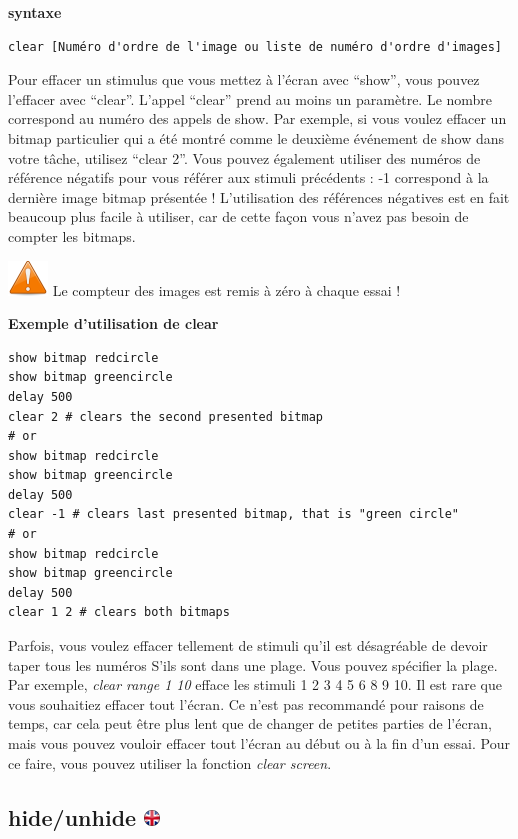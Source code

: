 \documentclass[
]{book}
\begin{document}
\textbf{syntaxe}

\begin{verbatim}
clear [Numéro d'ordre de l'image ou liste de numéro d'ordre d'images]
\end{verbatim}

Pour effacer un stimulus que vous mettez à l'écran avec ``show'', vous pouvez l'effacer avec ``clear''. L'appel ``clear'' prend au moins un paramètre. Le nombre correspond au numéro des appels de show. Par exemple, si vous voulez effacer un bitmap particulier qui a été montré comme le deuxième événement de show dans votre tâche, utilisez ``clear 2''. Vous pouvez également utiliser des numéros de référence négatifs pour vous référer aux stimuli précédents : -1 correspond à la dernière image bitmap présentée ! L'utilisation des références négatives est en fait beaucoup plus facile à utiliser, car de cette façon vous n'avez pas besoin de compter les bitmaps.

\includegraphics{img/attention.png} Le compteur des images est remis à zéro à chaque essai !

\textbf{Exemple d'utilisation de clear}

\begin{verbatim}
show bitmap redcircle
show bitmap greencircle
delay 500
clear 2 # clears the second presented bitmap
# or
show bitmap redcircle
show bitmap greencircle
delay 500
clear -1 # clears last presented bitmap, that is "green circle"
# or
show bitmap redcircle
show bitmap greencircle
delay 500
clear 1 2 # clears both bitmaps
\end{verbatim}

Parfois, vous voulez effacer tellement de stimuli qu'il est désagréable de devoir taper tous les numéros S'ils sont dans une plage. Vous pouvez spécifier la plage. Par exemple, \emph{clear range 1 10} efface les stimuli 1 2 3 4 5 6 8 9 10.
Il est rare que vous souhaitiez effacer tout l'écran. Ce n'est pas recommandé pour raisons de temps, car cela peut être plus lent que de changer de petites parties de l'écran, mais vous pouvez vouloir effacer tout l'écran au début ou à la fin d'un essai. Pour ce faire, vous pouvez utiliser la fonction \emph{clear screen}.

\hypertarget{hideunhide}{%
\subsection[hide/unhide ]{\texorpdfstring{hide/unhide \href{https://www.psytoolkit.org/doc3.2.0/syntax.html\#task-hide}{\protect\includegraphics{img/ukflag.png}}}{hide/unhide }}\label{hideunhide}}
\end{document}
